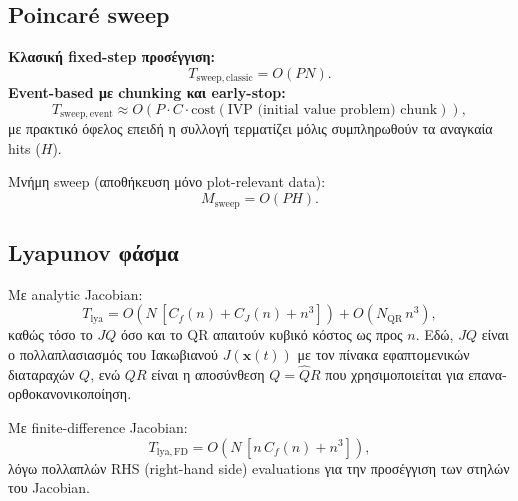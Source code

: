 \documentclass[11pt,a4paper]{report}
\begin{document}
\subsection{Poincar\'e sweep}

\textbf{Κλασική fixed-step προσέγγιση:}
\begin{equation}
T_{\mathrm{sweep,classic}} = O(PN).
\end{equation}
\textbf{Event-based με chunking και early-stop:}
\begin{equation}
T_{\mathrm{sweep,event}} \approx O\!\left(P \cdot C \cdot \mathrm{cost}(\text{IVP (initial value problem) chunk})\right),
\end{equation}
με πρακτικό όφελος επειδή η συλλογή τερματίζει μόλις συμπληρωθούν τα αναγκαία
hits (\(H\)).

Μνήμη sweep (αποθήκευση μόνο plot-relevant data):
\begin{equation}
M_{\mathrm{sweep}} = O(PH).
\end{equation}
\subsection{Lyapunov φάσμα}

Με analytic Jacobian:
\begin{equation}
T_{\mathrm{lya}} =
O\!\left(N\,[C_f(n)+C_J(n)+n^3]\right)
 + O\!\left(N_{\mathrm{QR}}\,n^3\right),
\end{equation}
καθώς τόσο το \(JQ\) όσο και το QR απαιτούν κυβικό κόστος ως προς \(n\).
Εδώ, \(JQ\) είναι ο πολλαπλασιασμός του Ιακωβιανού \(J(\mathbf{x}(t))\) με τον πίνακα εφαπτομενικών διαταραχών \(Q\), ενώ \(QR\) είναι η αποσύνθεση \(Q=\widehat Q R\) που χρησιμοποιείται για επανα-ορθοκανονικοποίηση.

Με finite-difference Jacobian:
\begin{equation}
T_{\mathrm{lya,FD}} =
O\!\left(N\,[n\,C_f(n)+n^3]\right),
\end{equation}
λόγω πολλαπλών RHS (right-hand side) evaluations για την προσέγγιση των στηλών του Jacobian.
\end{document}
